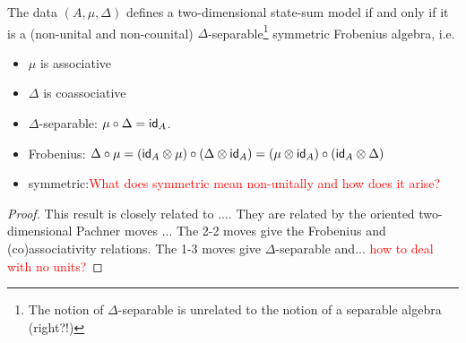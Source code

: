 \begin{theorem}
    The data $(A, \mu, \Delta)$ defines a two-dimensional state-sum model if and only if it is a (non-unital and non-counital) $\Delta$-separable\footnote{The notion of $\Delta$-separable is unrelated to the notion of a separable algebra (right?!)} symmetric Frobenius algebra, i.e.
    \begin{itemize}
        \item $\mu$ is associative
        \item $\Delta$ is coassociative
        \item $\Delta$-separable: $\mu \circ \Delta = \mathsf{id}_A$.
        \item Frobenius: $\Delta \circ \mu = (\mathsf{id}_A \otimes \mu) \circ (\Delta \otimes \mathsf{id}_A) = (\mu \otimes \mathsf{id}_A) \circ (\mathsf{id}_A \otimes \Delta)$
        \item symmetric:\textcolor{red}{What does symmetric mean non-unitally and how does it arise?}
    \end{itemize}
\end{theorem}

\begin{proof}
    This result is closely related to \cite[Proposition 3.4]{carqueville2016orbifoldcompletion}....
    They are related by the oriented two-dimensional Pachner moves \cite[Example 3.4(i)]{carqueville2019orbifolds}...
    The 2-2 moves give the Frobenius and (co)associativity relations.
    The 1-3 moves give $\Delta$-separable and... \textcolor{red}{how to deal with no units?}
\end{proof}
